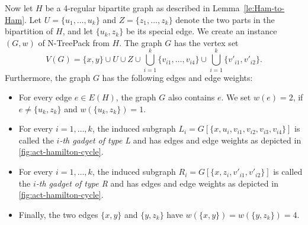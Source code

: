 \documentclass[runningheads]{llncs}
\newcommand{\set}[1]{\{ #1 \}}
\newcommand{\fromto}[2]{\set{#1, \ldots, #2}}
\newcommand{\xxxNTP}{{\sc N-TreePack}}
\begin{document}
Now let $H$ be a 4-regular bipartite graph as described in Lemma~\ref{le:Ham-to-Ham}.
Let $U=\fromto{u_1}{u_k}$ and $Z=\fromto{z_1}{z_k}$ denote the two parts in the bipartition of $H$, 
and let $\{u_k,z_k\}$ be its special edge.
We create an instance $(G,w)$ of {\xxxNTP} from $H$. 
The graph $G$ has the vertex set 
\[ 
V(G) =  \set{x, y} \cup U \cup Z 
        \cup \bigcup_{i=1}^k \fromto{v_{i1}}{v_{i4}} \cup \bigcup_{i=1}^k \set{v'_{i1}, v'_{i2}}.
\]
Furthermore, the graph $G$ has the following edges and edge weights:
\begin{itemize}
\item For every edge $e\in E(H)$, the graph $G$ also contains $e$. 
We set $w(e) = 2$, if $e \neq \set{u_k, z_k}$ and $w(\set{u_k, z_k}) = 1$.
\item For every $i = 1,\dots,k$, the induced subgraph $L_i = G[\set{x, u_i, v_{i1}, v_{i2}, v_{i3}, v_{i4}}]$ 
is called the \emph{$i$-th gadget of type L} and has edges and edge weights as depicted in \cref{fig:act-hamilton-cycle}.
\item For every $i = 1,\dots,k$, the induced subgraph $R_i = G[\set{x, z_i, v'_{i1}, v'_{i2}}]$ is called the 
\emph{$i$-th gadget of type R} and has edges and edge weights as depicted in \cref{fig:act-hamilton-cycle}.
\item Finally, the two edges $\set{x,y}$ and $\set{y, z_k}$ have $w(\set{x,y}) = w(\set{y, z_k}) = 4$.
\end{itemize}
\end{document}
